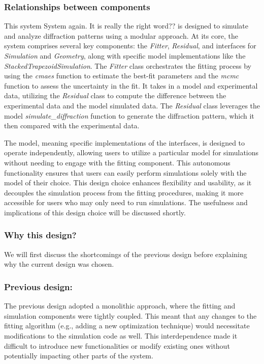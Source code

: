 \subsubsection{Relationships between components}

\medskip

This system \color{red}System again. It is really the right word?? \color{black} is designed to simulate and analyze diffraction patterns using
a modular approach. At its core, the system comprises several key components:
the \textit{Fitter}, \textit{Residual}, and interfaces for \textit{Simulation}
and \textit{Geometry}, along with specific model implementations like the
\textit{StackedTrapezoidSimulation}. The \textit{Fitter} class orchestrates
the fitting process by using the \textit{cmaes} function to estimate the best-fit parameters and
the \textit{mcmc} function to assess the uncertainty in the fit. It takes in a model and
experimental data, utilizing the \textit{Residual} class to compute the difference between
the experimental data and the model simulated data. The \textit{Residual} class leverages
the model \textit{simulate\_diffraction} function to generate the diffraction pattern,
which it then compared with the experimental data.

\medskip

The model, meaning specific implementations of the interfaces, is designed to operate 
independently, allowing users to utilize a particular model
for simulations without needing to engage with the fitting component. This autonomous 
functionality ensures that users can easily perform simulations solely with the model of
 their choice. This design choice enhances flexibility and usability, as it decouples the simulation process from the fitting procedures, making it more accessible for users who may only need to run simulations.
The usefulness and implications of this design choice will be discussed shortly.


\subsubsection{Why this design?}
We will first discuss the shortcomings of the previous design before explaining why the current design was chosen.

\subsubsection*{Previous design:}

The previous design adopted a monolithic approach, where the fitting and simulation components were tightly coupled. This meant that any changes to the fitting algorithm (e.g., adding a new optimization technique) would necessitate modifications to the simulation code as well. This interdependence made it difficult to introduce new functionalities or modify existing ones without potentially impacting other parts of the system.

